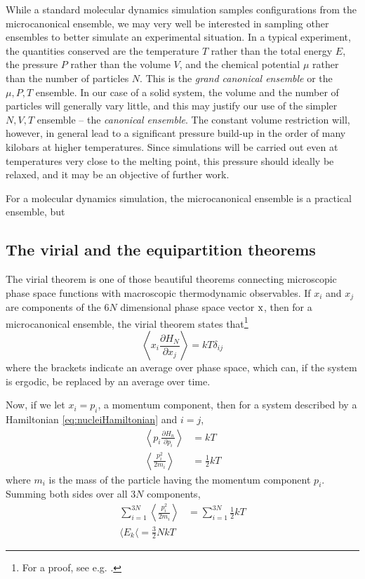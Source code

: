 \documentclass[11pt,bibliography=totoc,index=totoc]{scrbook}   %
\begin{document}
While a standard molecular dynamics simulation samples configurations from the microcanonical ensemble, we may very well be interested in sampling other ensembles to better simulate an experimental situation. 
In a typical experiment, the quantities conserved are the temperature $T$ rather than the total energy $E$, the pressure $P$ rather than the volume $V$, and the chemical potential $\mu$ rather than the number of particles $N$. 
This is the \emph{grand canonical ensemble} or the $\mu,P,T$ ensemble. 
In our case of a solid system, the volume and the number of particles will generally vary little, and this may justify our use of the simpler $N,V,T$ ensemble -- the \emph{canonical ensemble}. 
The constant volume restriction will, however, in general lead to a significant pressure build-up in the order of many kilobars at higher temperatures. 
Since simulations will be carried out even at temperatures very close to the melting point, this pressure should ideally be relaxed, and it may be an objective of further work.





For a molecular dynamics simulation, the microcanonical ensemble is a practical ensemble, but  

\subsection{The virial and the equipartition theorems}

The virial theorem is one of those beautiful theorems connecting microscopic phase space functions with macroscopic thermodynamic observables. 
If $x_i$ and $x_j$ are components of the $6N$ dimensional phase space vector $\mathrm{x}$, 
then for a microcanonical ensemble, the virial theorem states that\footnote{For a proof, see e.g. \cite[81]{Tuckerman:2010}.}
\begin{equation}
  \left\langle x_i \frac{\partial H_N}{\partial x_j}\right\rangle = kT \delta_{ij}
\end{equation}
where the brackets indicate an average over phase space, which can, if the system is ergodic, be replaced by an average over time.

Now, if we let $x_i = p_i$, a momentum component, then for a system described by a Hamiltonian \eqref{eq:nucleiHamiltonian} and $i=j$,
\begin{align}
  \left\langle p_i \frac{\partial H_n}{\partial p_i}\right\rangle &= kT  \\
  \left\langle \frac{p_i^2}{2m_i}\right\rangle &= \frac12kT
\end{align}
where $m_i$ is the mass of the particle having the momentum component $p_i$. 
Summing both sides over all $3N$ components, 
\begin{align}
  \sum_{i=1}^{3N} \left\langle\frac{p_i^2}{2m_i} \right\rangle &= \sum_{i=1}^{3N} \frac12 kT \\
  \langle E_k \langle = \frac32 NkT
\end{align}
\end{document}
